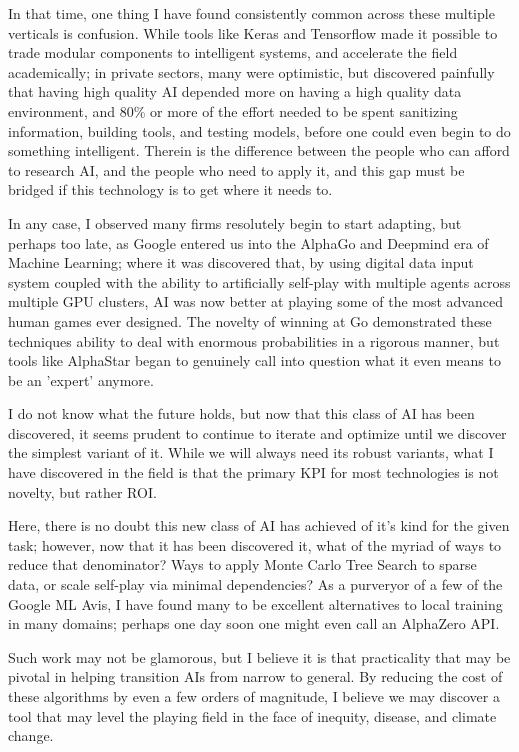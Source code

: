 \documentclass[11pt, a4paper]{awesome-cv}
\begin{document}
\begin{cvletter}
In that time, one thing I have found consistently common across these multiple
verticals is confusion. While tools like Keras and Tensorflow made it possible to trade modular components to intelligent systems,
and accelerate the field academically; in private
sectors, many were optimistic, but discovered painfully that having high quality AI depended more on
having a high quality data environment, and 80\% or more of the effort needed to
be spent sanitizing information, building tools, and testing models, before one
could even begin to do something intelligent. Therein is the difference between the people who
can afford to research AI, and the people who need to apply it, and this gap
must be bridged if this technology is to get where it needs to.

In any case, I observed many firms resolutely begin to start adapting, but
perhaps too late, as Google entered us into the AlphaGo and Deepmind era of Machine Learning; where it was discovered that, by using digital data input system coupled with the ability to artificially self-play with multiple agents across multiple GPU clusters, AI was now better
at playing some of the most advanced human games ever designed. The
novelty of winning at Go demonstrated these techniques ability to deal with
enormous probabilities in a rigorous manner, but tools like AlphaStar
began to genuinely call into question what it even means to be an 'expert'
anymore.

I do not know what the future holds, but now that this class of AI has been
discovered, it seems prudent to continue to iterate and optimize until we
discover the simplest variant of it. While we will always need its robust variants, what
I have discovered in the field is that the primary KPI for most technologies is not novelty,
but rather ROI.

Here, there is no doubt this new class of AI has achieved of it's kind for the given task; however, now that it has been discovered it, what of the myriad of ways to reduce that denominator? Ways to apply
Monte Carlo Tree Search to sparse data, or scale self-play via minimal
dependencies? As a purveryor of a few of the Google ML Avis, I have found many
to be excellent alternatives to local training in many domains; perhaps one day
soon one might even call an AlphaZero API.

Such work may not be glamorous, but I believe it is that practicality that may
be pivotal in helping transition AIs from narrow to general. By reducing the cost of
these algorithms by even a few orders of magnitude, I believe we may discover a tool that
may level the playing field in the face of inequity, disease, and climate change.


\end{cvletter}
\end{document}
